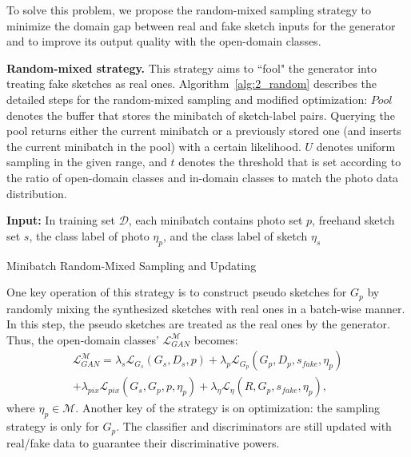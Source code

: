 \documentclass[10pt,twocolumn,letterpaper]{article}
\begin{document}
To solve this problem, we propose the random-mixed sampling strategy to minimize the domain gap between real and fake sketch inputs for the generator and to improve its output quality with the open-domain classes. 

\noindent \textbf{Random-mixed strategy.} This strategy aims to ``fool" the generator into treating fake sketches as real ones. Algorithm~\ref{alg:2_random} describes the detailed steps for the random-mixed sampling and modified optimization: $Pool$ denotes the buffer that stores the minibatch of sketch-label pairs. Querying the pool returns either the current minibatch or a previously stored one (and inserts the current minibatch in the pool) with a certain likelihood. $U$ denotes uniform sampling in the given range, and $t$ denotes the threshold that is set according to the ratio of open-domain classes and in-domain classes to match the photo data distribution.

\begin{algorithm}[ht]
\SetAlgoLined
\textbf{Input:} In training set $\mathcal{D}$, each minibatch contains photo set $p$, freehand sketch set $s$, the class label of photo $\eta_{p}$, and the class label of sketch $\eta_{s}$\;
 \caption{Minibatch Random-Mixed Sampling and Updating}
 \label{alg:2_random}
\end{algorithm}

One key operation of this strategy is to construct pseudo sketches for $G_{p}$ by randomly mixing the synthesized sketches with real ones in a batch-wise manner. In this step, the pseudo sketches are treated as the real ones by the generator. Thus, the open-domain classes' $\mathcal{L}_{GAN}^{\mathcal{M}}$ becomes:
\begin{multline}
    \mathcal{L}_{GAN}^{\mathcal{M}} = \lambda_s\mathcal{L}_{G_{s}}(G_{s}, D_s, p) + \lambda_p\mathcal{L}_{G_{p}}(G_{p},D_p,s_{fake},\eta_p) \\ + \lambda_{pix}\mathcal{L}_{pix}(G_{s},G_{p},p,\eta_p) + \lambda_{\eta}\mathcal{L}_{\eta}(R,G_{p},s_{fake},\eta_p),
\end{multline}
where $\eta_p \in \mathcal{M}$. Another key of the strategy is on optimization: the sampling strategy is only for $G_{p}$. The classifier and discriminators are still updated with real/fake data to guarantee their discriminative powers. 
\end{document}

